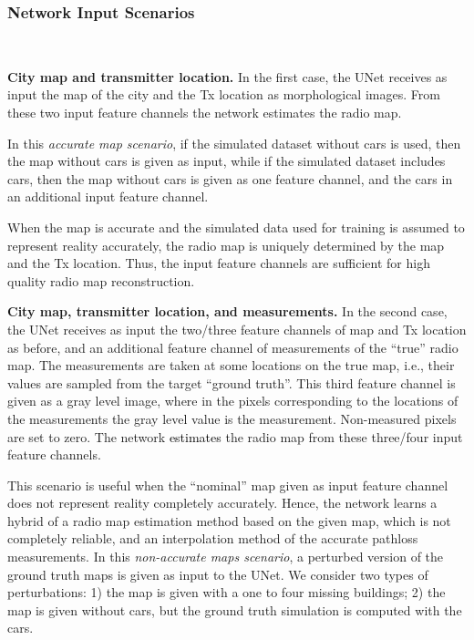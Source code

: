 \documentclass[10pt,a4paper]{article}
\begin{document}
\subsubsection{Network Input Scenarios}
\label{Network input scenarios} $ $

\par{\noindent\textbf{City map and transmitter location.}}
In the first case, the UNet receives as input the map of the city and the Tx location as morphological images. %
From these two input feature channels the network estimates the radio map.

In this {\em accurate map scenario}, if the simulated dataset without cars is used, then the map without cars is given as input, while if the simulated dataset includes cars, then the map without cars is given as one feature channel, and the cars in an additional input feature channel.

When the map is accurate and the simulated data used for training is assumed to represent reality accurately, 
the radio map is uniquely determined by the map and the Tx location. 
Thus, the input feature channels are sufficient for high quality radio map reconstruction.
\vspace{1mm}

\par{\noindent\textbf{City map, transmitter location, and measurements.}}
In the second case, the UNet receives as input the two/three feature channels of map and Tx location as before, and an additional feature channel of measurements of the ``true'' radio map. The measurements are taken at some locations on the true map, i.e., their values are sampled from the target ``ground truth''. This third feature channel is given as a gray level image, where in the pixels corresponding to the locations of the measurements the gray level value is the measurement. Non-measured pixels are set to zero. The network \textcolor{black}{estimates} the radio map from these three/four input feature channels.

This scenario is useful when the ``nominal'' map given as input feature channel does not represent reality completely accurately. Hence, the network learns a hybrid of a radio map estimation method based on the given map, which is not completely reliable, and an interpolation method of the accurate pathloss measurements.
%
In this {\em non-accurate maps scenario}, a perturbed version of the ground truth maps is given as input to the UNet. 
We consider two types of perturbations: 1) the map is given with a one to four missing buildings; 2)  the map is given without cars, but the ground truth simulation is computed with the cars. 
\end{document}
